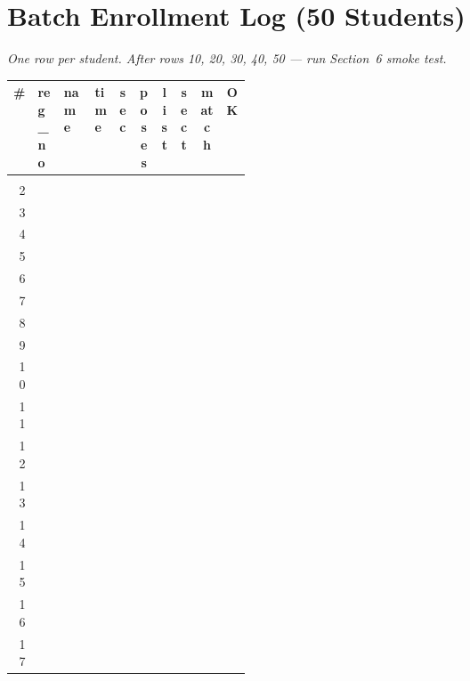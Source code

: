 \documentclass[11pt,a4paper,oneside]{article}
\newcommand{\chk}{\fbox{\rule{0pt}{0.95ex}\rule{0.95ex}{0pt}}}
\begin{document}
\section{Batch Enrollment Log (50 Students)}

\noindent\textit{One row per student. After rows 10, 20, 30, 40, 50 — run Section~6 smoke test.}

\smallskip
{\footnotesize
\setlength{\tabcolsep}{3pt}
\begin{longtable}{@{}r >{\raggedright\arraybackslash}p{0.11\linewidth} >{\raggedright\arraybackslash}p{0.13\linewidth} >{\raggedright\arraybackslash}p{0.07\linewidth} c c c c c c@{}}
  \toprule
  \textbf{\#} & \textbf{reg\_no} & \textbf{name} & \textbf{time} & \textbf{sec} & \textbf{poses} & \textbf{list} & \textbf{sect} & \textbf{match} & \textbf{OK} \\
  \midrule
  \endhead
  \bottomrule
  \endfoot
  1 & & & & & \chk & \chk & \chk & \chk & \chk \\
  2 & & & & & \chk & \chk & \chk & \chk & \chk \\
  3 & & & & & \chk & \chk & \chk & \chk & \chk \\
  4 & & & & & \chk & \chk & \chk & \chk & \chk \\
  5 & & & & & \chk & \chk & \chk & \chk & \chk \\
  6 & & & & & \chk & \chk & \chk & \chk & \chk \\
  7 & & & & & \chk & \chk & \chk & \chk & \chk \\
  8 & & & & & \chk & \chk & \chk & \chk & \chk \\
  9 & & & & & \chk & \chk & \chk & \chk & \chk \\
  10 & & & & & \chk & \chk & \chk & \chk & \chk \\
  11 & & & & & \chk & \chk & \chk & \chk & \chk \\
  12 & & & & & \chk & \chk & \chk & \chk & \chk \\
  13 & & & & & \chk & \chk & \chk & \chk & \chk \\
  14 & & & & & \chk & \chk & \chk & \chk & \chk \\
  15 & & & & & \chk & \chk & \chk & \chk & \chk \\
  16 & & & & & \chk & \chk & \chk & \chk & \chk \\
  17 & & & & & \chk & \chk & \chk & \chk & \chk \\

\end{longtable}}
\end{document}
